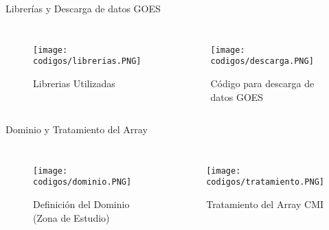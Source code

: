 \documentclass[aspectratio=169,xcolor=dvipsnames]{beamer}
\begin{document}
\begin{frame}{Librerías y Descarga de datos GOES}
    \begin{columns}

        \begin{figure}
            \centering
            \texttt{[image: codigos/librerias.PNG]}
            {\footnotesize %
            \caption{Librerias Utilizadas}
            \label{fig4}
            }
        \end{figure}
        \begin{figure}
            \centering
            \texttt{[image: codigos/descarga.PNG]}
            {\footnotesize %
            \caption{Código para descarga de datos GOES}
            \label{fig5}
            }
        \end{figure}

    \end{columns}
\end{frame}
\begin{frame}{Dominio y Tratamiento del Array}
    \begin{columns}

        \begin{figure}
            \centering
            \texttt{[image: codigos/dominio.PNG]}
            {\footnotesize %
            \caption{Definición del Dominio (Zona de Estudio)}
            \label{fig6}
            }
        \end{figure}
        \begin{figure}
            \centering
            \texttt{[image: codigos/tratamiento.PNG]}
            {\footnotesize %
            \caption{Tratamiento del Array CMI}
            \label{fig7}
            }
        \end{figure}

    \end{columns}
\end{frame}
\end{document}
